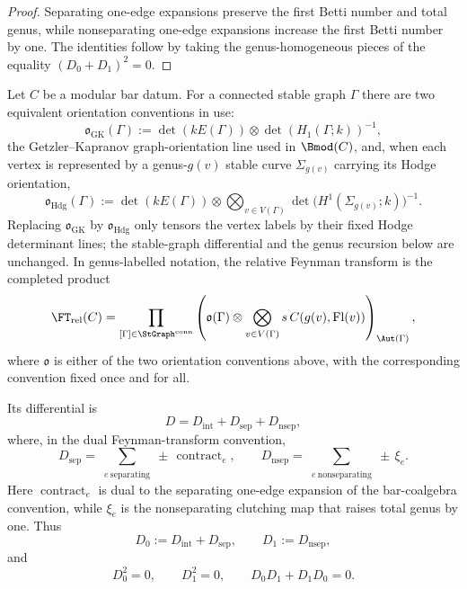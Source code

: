 \begin{proof}
Separating one-edge expansions preserve the first Betti number and total genus, while
nonseparating one-edge expansions increase the first Betti number by one. The identities
follow by taking the genus-homogeneous pieces of the equality $(D_0+D_1)^2=0$.
\end{proof}

\begin{theorem}
\label{thm:explicit-relative-modular-graph-complex}
Let $C$ be a modular bar datum. For a connected stable graph $\Gamma$ there are two
equivalent orientation conventions in use:
\[
\mathfrak{o}_{\mathrm{GK}}(\Gamma)
:=
\det(kE(\Gamma))\otimes \det(H_1(\Gamma;k))^{-1},
\]
the Getzler--Kapranov graph-orientation line used in $\Bmod(C)$, and, when each vertex
is represented by a genus-$g(v)$ stable curve $\Sigma_{g(v)}$ carrying its Hodge
orientation,
\[
\mathfrak{o}_{\mathrm{Hdg}}(\Gamma)
:=
\det(kE(\Gamma))\otimes
\bigotimes_{v\in V(\Gamma)}
\det\!\bigl(H^1(\Sigma_{g(v)};k)\bigr)^{-1}.
\]
Replacing $\mathfrak{o}_{\mathrm{GK}}$ by $\mathfrak{o}_{\mathrm{Hdg}}$ only tensors
the vertex labels by their fixed Hodge determinant lines; the stable-graph
differential and the genus recursion below are unchanged. In genus-labelled notation,
the relative Feynman transform is the completed product
\[
\FT_{\mathrm{rel}}(C)
=
\prod_{[\Gamma]\in \StGraph^{\mathrm{conn}}}
\left(
\mathfrak{o}(\Gamma)\otimes
\bigotimes_{v\in V(\Gamma)}s\,C(g(v),\mathrm{Fl}(v))
\right)_{\Aut(\Gamma)},
\]
where $\mathfrak{o}$ is either of the two orientation conventions above, with the
corresponding convention fixed once and for all.

Its differential is
\[
D=D_{\mathrm{int}}+D_{\mathrm{sep}}+D_{\mathrm{nsep}},
\]
where, in the dual Feynman-transform convention,
\[
D_{\mathrm{sep}}
=
\sum_{\substack{e\ \mathrm{separating}}}
\pm\,\operatorname{contract}_e,
\qquad
D_{\mathrm{nsep}}
=
\sum_{\substack{e\ \mathrm{nonseparating}}}
\pm\,\xi_e.
\]
Here $\operatorname{contract}_e$ is dual to the separating one-edge expansion of the
bar-coalgebra convention, while $\xi_e$ is the nonseparating clutching map that
raises total genus by one. Thus
\[
D_0:=D_{\mathrm{int}}+D_{\mathrm{sep}},
\qquad
D_1:=D_{\mathrm{nsep}},
\]
and
\[
D_0^2=0,\qquad
D_1^2=0,\qquad
D_0D_1+D_1D_0=0.
\]


\end{theorem}
